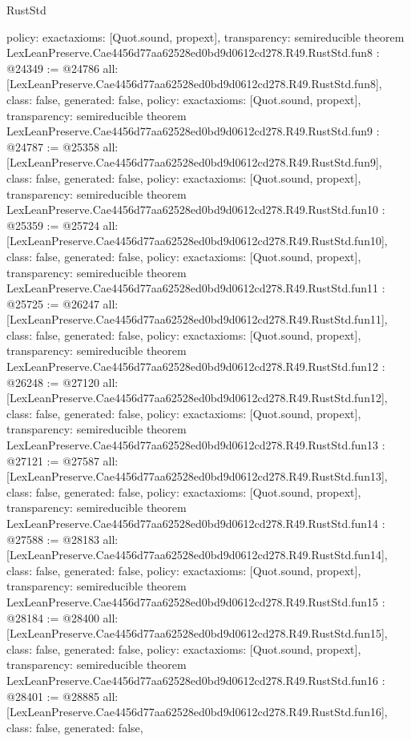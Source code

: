 \begin{lexlean}{RustStd}
\begin{coremodule}
{  policy: exact{axioms: [Quot.sound, propext]},
  transparency: semireducible
}
theorem LexLeanPreserve.Cae4456d77aa62528ed0bd9d0612cd278.R49.RustStd.fun8 : @24349 := @24786 {
  all: [LexLeanPreserve.Cae4456d77aa62528ed0bd9d0612cd278.R49.RustStd.fun8],
  class: false,
  generated: false,
  policy: exact{axioms: [Quot.sound, propext]},
  transparency: semireducible
}
theorem LexLeanPreserve.Cae4456d77aa62528ed0bd9d0612cd278.R49.RustStd.fun9 : @24787 := @25358 {
  all: [LexLeanPreserve.Cae4456d77aa62528ed0bd9d0612cd278.R49.RustStd.fun9],
  class: false,
  generated: false,
  policy: exact{axioms: [Quot.sound, propext]},
  transparency: semireducible
}
theorem LexLeanPreserve.Cae4456d77aa62528ed0bd9d0612cd278.R49.RustStd.fun10 : @25359 := @25724 {
  all: [LexLeanPreserve.Cae4456d77aa62528ed0bd9d0612cd278.R49.RustStd.fun10],
  class: false,
  generated: false,
  policy: exact{axioms: [Quot.sound, propext]},
  transparency: semireducible
}
theorem LexLeanPreserve.Cae4456d77aa62528ed0bd9d0612cd278.R49.RustStd.fun11 : @25725 := @26247 {
  all: [LexLeanPreserve.Cae4456d77aa62528ed0bd9d0612cd278.R49.RustStd.fun11],
  class: false,
  generated: false,
  policy: exact{axioms: [Quot.sound, propext]},
  transparency: semireducible
}
theorem LexLeanPreserve.Cae4456d77aa62528ed0bd9d0612cd278.R49.RustStd.fun12 : @26248 := @27120 {
  all: [LexLeanPreserve.Cae4456d77aa62528ed0bd9d0612cd278.R49.RustStd.fun12],
  class: false,
  generated: false,
  policy: exact{axioms: [Quot.sound, propext]},
  transparency: semireducible
}
theorem LexLeanPreserve.Cae4456d77aa62528ed0bd9d0612cd278.R49.RustStd.fun13 : @27121 := @27587 {
  all: [LexLeanPreserve.Cae4456d77aa62528ed0bd9d0612cd278.R49.RustStd.fun13],
  class: false,
  generated: false,
  policy: exact{axioms: [Quot.sound, propext]},
  transparency: semireducible
}
theorem LexLeanPreserve.Cae4456d77aa62528ed0bd9d0612cd278.R49.RustStd.fun14 : @27588 := @28183 {
  all: [LexLeanPreserve.Cae4456d77aa62528ed0bd9d0612cd278.R49.RustStd.fun14],
  class: false,
  generated: false,
  policy: exact{axioms: [Quot.sound, propext]},
  transparency: semireducible
}
theorem LexLeanPreserve.Cae4456d77aa62528ed0bd9d0612cd278.R49.RustStd.fun15 : @28184 := @28400 {
  all: [LexLeanPreserve.Cae4456d77aa62528ed0bd9d0612cd278.R49.RustStd.fun15],
  class: false,
  generated: false,
  policy: exact{axioms: [Quot.sound, propext]},
  transparency: semireducible
}
theorem LexLeanPreserve.Cae4456d77aa62528ed0bd9d0612cd278.R49.RustStd.fun16 : @28401 := @28885 {
  all: [LexLeanPreserve.Cae4456d77aa62528ed0bd9d0612cd278.R49.RustStd.fun16],
  class: false,
  generated: false,
}
\end{coremodule}
\end{lexlean}
